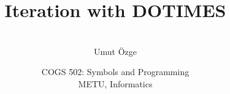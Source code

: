 \documentclass[ignorenonframetext,10pt,aspectratio=169]{beamer}
\title{Iteration with DOTIMES}
\author{\  \\ \vspace{20pt} Umut \"Ozge\\  }
\date{COGS 502: Symbols and Programming \\ METU, Informatics}
\begin{document}
\begin{frame}\frametitle{}
\thispagestyle{empty}
\maketitle
\end{frame}

\begin{frame}[t,plain]{}

\end{frame}


\begin{frame}[t,plain]{}


\end{frame}

\begin{frame}[t,plain]{}


\end{frame}

\begin{frame}[t,plain]{}


\end{frame}

\begin{frame}[t,plain]{}


\end{frame}
\end{document}
